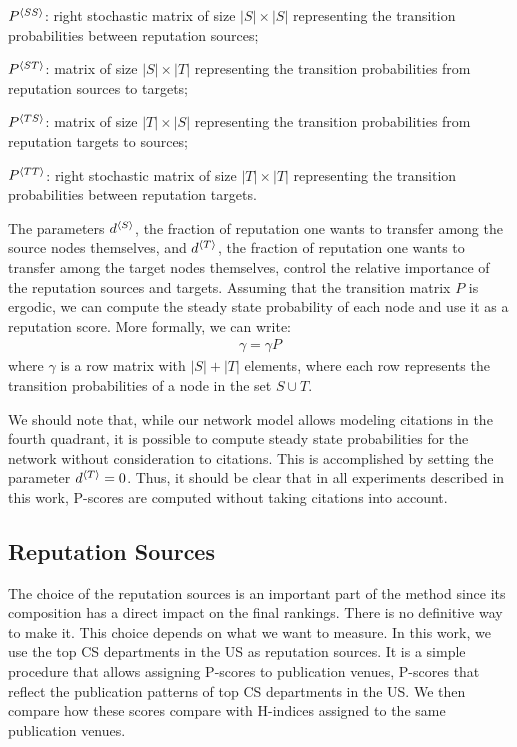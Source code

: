 \documentclass[man]{apa6}
\begin{document}
\begin{description}
\item $P{^{\langle SS \rangle}}$: right stochastic matrix of size $|S|\times |S|$ representing the transition probabilities between reputation sources;
\item $P{^{\langle ST \rangle}}$: matrix of size $|S|\times |T|$ representing the transition probabilities from reputation sources to targets;
\item $P{^{\langle TS \rangle}}$: matrix of size $|T|\times |S|$ representing the transition probabilities from reputation targets to sources;
\item $P{^{\langle TT \rangle}}$: right stochastic matrix of size $|T|\times |T|$ representing the transition probabilities between reputation targets.
\end{description}

The parameters $d{^{\langle S \rangle}}$, the fraction of reputation one wants to transfer among the source nodes themselves, 
and $d{^{\langle T \rangle}}$, the fraction of reputation one wants to transfer among the target nodes themselves,
control the relative importance of the reputation sources and targets. 
Assuming that the transition matrix $P$ is ergodic, we can compute the steady state probability of each node and use it as a reputation score. 
More formally, we can write: 
\begin{align}
\label{eq:ggP}
\gamma = \gamma P
\end{align}
\noindent where $\gamma$ is a row matrix with $|S|+|T|$ elements, 
where each row represents the transition probabilities of a node in the set $S\cup T$. 

We should note that, while our network model allows modeling citations in the fourth quadrant, it is possible to compute 
steady state probabilities for the network without consideration to citations. This is accomplished by setting the parameter 
$d{^{\langle T \rangle}} = 0$. 
Thus, it should be clear that in all experiments described in this work, P-scores 
are computed without taking citations into account. 

\subsection{Reputation Sources}
\label{sec:rep-sources}

The choice of the reputation sources is an important part of the method since its composition has a direct impact on the final rankings. There is no definitive way to make it. This choice depends on what we want to measure. In this work, we 
use the top CS departments in the US as reputation sources. It is a simple procedure that allows assigning P-scores 
to publication venues, P-scores that 
reflect the publication patterns of top CS departments in the US. 
We then compare how these scores compare with H-indices assigned to the same publication venues. 
\end{document}
